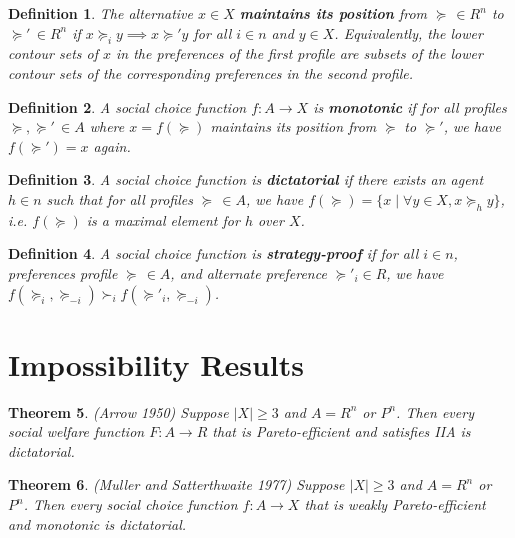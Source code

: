 \documentclass[letter, 10pt]{article}
\newtheorem{theorem}{Theorem}[section]
\newtheorem{definition}[theorem]{Definition}
\theoremstyle{definition}
\begin{document}
\begin{spacing}{1.1}
\begin{definition}
  The alternative $x\in X$ \textbf{maintains its
    position} from $\succeq\,\in R^n$ to $\succeq' \,\in
  R^n$ if $x \succeq_i y \implies x \succeq' y$ for all
  $i\in n$ and $y \in X$. Equivalently, the lower contour
  sets of $x$ in the preferences of the first profile are
  subsets of the lower contour sets of the corresponding
  preferences in the second profile.
\end{definition}

\begin{definition}
  A social choice function $f: A \to X$ is
  \textbf{monotonic} if for all profiles $\succeq,
  \succeq'\,\in A$ where $x = f(\succeq)$ maintains its
  position from $\succeq$ to $\succeq'$, we have
  $f(\succeq')=x$ again.
\end{definition}

\begin{definition}
  A social choice function is \textbf{dictatorial} if
  there exists an agent $h\in n$ such that for all
  profiles $\succeq \,\in A$, we have $f(\succeq) =
  \{x\;|\; \forall y\in X, x\succeq_h y\}$,
  i.e. $f(\succeq)$ is a maximal element for $h$ over $X$.
\end{definition}

\begin{definition}
  A social choice function is \textbf{strategy-proof} if
  for all $i\in n$, preferences profile $\succeq\,\in A$,
  and alternate preference $\succeq'_i \in R$, we have
  $f(\succeq_i, \succeq_{-i}) \succ_i f(\succeq'_i, \succeq_{-i})$.
\end{definition}

\section{Impossibility Results}

\begin{theorem}
  (Arrow 1950) Suppose $|X| \geq 3$ and $A = R^n$ or
  $P^n$. Then every social welfare function $F:A\to R$
  that is Pareto-efficient and satisfies IIA is dictatorial.
\end{theorem}

\begin{theorem}
  (Muller and Satterthwaite 1977) Suppose $|X| \geq 3$
  and $A = R^n$ or $P^n$. Then every social choice
  function $f:A \to X$ that is weakly Pareto-efficient
  and monotonic is dictatorial.
\end{theorem}


\end{spacing}
\end{document}
